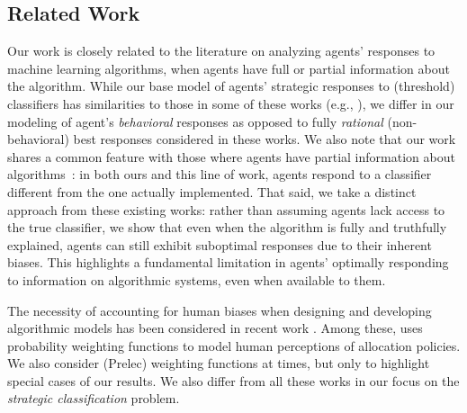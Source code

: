 \subsection{Related Work} 
Our work is closely related to the literature on analyzing agents' responses to machine learning algorithms, when agents have full \cite{Hardt2016strategic, Perdomo2020performative, Milli2019socialcost, Hu2019disparate, Liu2020disparateequilibria, kleinberg202induce, alhanouti2024could, pmlr-v162-zhang22l, bechavod2021gaming} or partial information \cite{haghtalab2023calibratedstackelberggameslearning,cohen2024bayesian, bechavod2022information, harris2022bayesian, Ghalme2021StrategicCI, chen2023persuading, de2022non} about the algorithm. While our base model of agents' strategic responses to (threshold) classifiers has similarities to those in some of these works (e.g., \cite{Hu2019disparate, Liu2020disparateequilibria}), we differ in our modeling of agent's \emph{behavioral} responses as opposed to fully \emph{rational} (non-behavioral) best responses considered in these works. We also note that our work shares a common feature with those where agents have partial information about algorithms~\cite{Ghalme2021StrategicCI, chen2023persuading, de2022non}: in both ours and this line of work, agents respond to a classifier different from the one actually implemented. That said, we take a distinct approach from these existing works: rather than assuming agents lack access to the true classifier, we show that even when the algorithm is fully and truthfully explained, agents can still exhibit suboptimal responses due to their inherent biases. This highlights a fundamental limitation in agents' optimally responding to information on algorithmic systems, even when available to them. 


The necessity of accounting for human biases when designing and developing algorithmic models has been considered in recent work \cite{Morewedge2023bias, zhu2024capturingcomplexityhumanstrategic, liu2024largelanguagemodelsassume,heidari2021perceptions}. Among these, \cite{heidari2021perceptions} uses probability weighting functions to model human perceptions of allocation policies. We also consider (Prelec) weighting functions at times, but only to highlight special cases of our results. We also differ from all these works in our focus on the \emph{strategic classification} problem.

